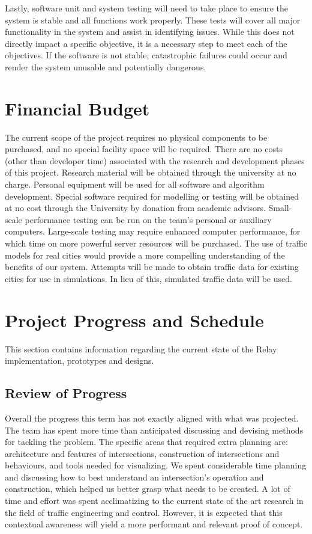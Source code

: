 \documentclass{article}
\begin{document}
Lastly, software unit and system testing will need to take place to ensure the system is stable and all functions work properly.
These tests will cover all major functionality in the system and assist in identifying issues.
While this does not directly impact a specific objective, it is a necessary step to meet each of the objectives.
If the software is not stable, catastrophic failures could occur and render the system unusable and potentially dangerous.\\

\section{Financial Budget}

The current scope of the project requires no physical components to be purchased, and no special facility space will be required.
There are no costs (other than developer time) associated with the research and development phases of this project.
Research material will be obtained through the university at no charge.
Personal equipment will be used for all software and algorithm development. Special software required for modelling or testing will be obtained at no cost through the University by donation from academic advisors.
Small-scale performance testing can be run on the team's personal or auxiliary computers.
Large-scale testing may require enhanced computer performance, for which time on more powerful server resources will be purchased.
The use of traffic models for real cities would provide a more compelling understanding of the benefits of our system.
Attempts will be made to obtain traffic data for existing cities for use in simulations.
In lieu of this, simulated traffic data will be used.\\

\newpage
\section{Project Progress and Schedule}
This section contains information regarding the current state of the Relay implementation, prototypes and designs.

\subsection{Review of Progress}

Overall the progress this term has not exactly aligned with what was projected.
The team has spent more time than anticipated discussing and devising methods for tackling the problem.
The specific areas that required extra planning are: architecture and features of intersections, construction of intersections and behaviours, and tools needed for visualizing.
We spent considerable time planning and discussing how to best understand an intersection's operation and construction, which helped us better grasp what needs to be created.
A lot of time and effort was spent acclimatizing to the current state of the art research in the field of traffic engineering and control.
However, it is expected that this contextual awareness will yield a more performant and relevant proof of concept.\\
\end{document}
